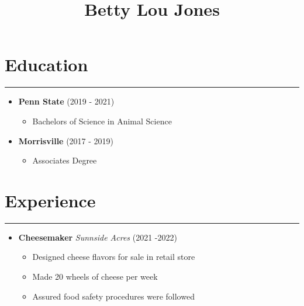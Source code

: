 \documentclass[
]{article}
\title{Betty Lou Jones}
\author{}
\date{\vspace{-2.5em}}
\providecommand{\tightlist}{%
  \setlength{\itemsep}{0pt}\setlength{\parskip}{0pt}}
\begin{document}
\maketitle

\hypertarget{education}{%
\section{Education}\label{education}}

\begin{center}\rule{0.5\linewidth}{0.5pt}\end{center}

\begin{itemize}
\tightlist
\item
  \textbf{Penn State} (2019 - 2021)

  \begin{itemize}
  \tightlist
  \item
    Bachelors of Science in Animal Science
  \end{itemize}
\item
  \textbf{Morrisville} (2017 - 2019)

  \begin{itemize}
  \tightlist
  \item
    Associates Degree
  \end{itemize}
\end{itemize}

\hypertarget{experience}{%
\section{Experience}\label{experience}}

\begin{center}\rule{0.5\linewidth}{0.5pt}\end{center}

\begin{itemize}
\tightlist
\item
  \textbf{Cheesemaker} \emph{Sunnside Acres} (2021 -2022)

  \begin{itemize}
  \tightlist
  \item
    Designed cheese flavors for sale in retail store
  \item
    Made 20 wheels of cheese per week
  \item
    Assured food safety procedures were followed
  \end{itemize}
\end{itemize}
\end{document}
